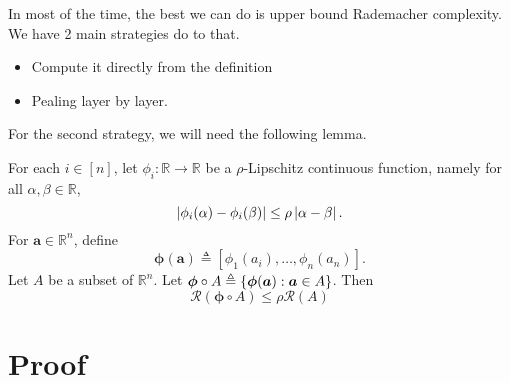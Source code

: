 \documentclass[11pt,a4paper]{article}
\begin{document}
In most of the time, the best we can do is upper bound Rademacher complexity. We have 2 main strategies do to that.
\begin{itemize}
    \item Compute it directly from the definition
    \item Pealing layer by layer.
\end{itemize}
For the second strategy, we will need the following lemma.
\begin{lemma}
    For each $i \in [n]$, let $\phi_{i}: \mathbb{R} \to \mathbb{R}$ be a $\rho$-Lipschitz continuous function, namely for all $\alpha, \beta \in \mathbb{R}$, 
    \[
    \left\lvert\phi_i(\alpha) - \phi_i(\beta)\right\rvert \leq \rho \left\lvert\alpha - \beta\right\rvert.
    \] 
    For $\bm{a} \in \mathbb{R}^{n}$, define 
    \[
    \boldsymbol \phi(\bm{a}) \triangleq [\phi_1(a_i), \ldots , \phi_n(a_n)].
    \] 
    Let $A$ be a subset of $\mathbb{R}^{n}$. Let $\boldsymbol \phi \circ A \triangleq \left\{\boldsymbol \phi(\bm{a}): \bm{a} \in A\right\}$. Then
    \[
    \mathcal{R}(\boldsymbol \phi \circ A) \leq \rho \mathcal{R}(A)
    \] 
\end{lemma}


\section{Proof}%
\label{sec:proof}


\pagebreak
\printbibliography
\end{document}
